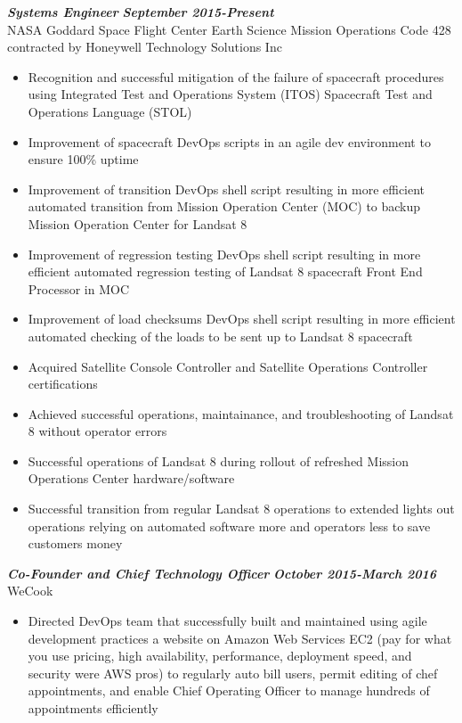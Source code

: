 \documentclass{res}
\begin{document}
\begin{resume}
	{\bfseries {\em Systems Engineer}}  \hfill  {\bfseries{\em September 2015-Present}}\\
		NASA Goddard Space Flight Center Earth Science Mission Operations Code 428\\
		contracted by Honeywell Technology Solutions Inc
                \begin{itemize}  \itemsep -2pt %
		\item Recognition and successful mitigation of the failure of spacecraft procedures using Integrated Test and Operations System (ITOS) Spacecraft Test and Operations Language (STOL)
		\item Improvement of spacecraft DevOps scripts in an agile dev environment to ensure 100\% uptime
		\item Improvement of transition DevOps shell script resulting in more efficient automated transition from Mission Operation Center (MOC) to backup Mission Operation Center for Landsat 8
		\item Improvement of regression testing DevOps shell script resulting in more efficient automated regression testing of Landsat 8 spacecraft Front End Processor in MOC
		\item Improvement of load checksums  DevOps shell script resulting in more efficient automated checking of the loads to be sent up to Landsat 8 spacecraft
		\item Acquired Satellite Console Controller and Satellite Operations Controller certifications
		\item Achieved successful operations, maintainance, and troubleshooting of Landsat 8 without operator errors
		\item Successful operations of Landsat 8 during rollout of refreshed Mission Operations Center hardware/software
		\item Successful transition from regular Landsat 8 operations to extended lights out operations relying on automated software more and operators less to save customers money
                \end{itemize}
	{\bfseries {\em Co-Founder and Chief Technology Officer}}  \hfill  {\bfseries{\em October 2015-March 2016}}\\
		WeCook
                \begin{itemize}  \itemsep -2pt %
		\item Directed DevOps team that successfully built and maintained using agile development practices a website on Amazon Web Services EC2 (pay for what you use pricing, high availability, performance, deployment speed, and security were AWS pros) to regularly auto bill users, permit editing of chef appointments, and enable Chief Operating Officer to manage hundreds of appointments efficiently

\end{itemize}
\end{resume}
\end{document}
